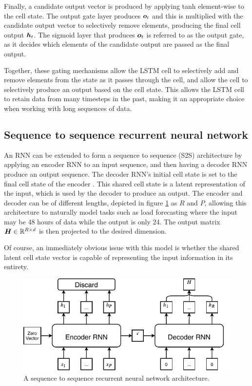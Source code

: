 Finally, a candidate output vector is produced by applying tanh element-wise to the cell state.
The output gate layer produces ${\bm{o}}_t$ and this is multiplied with the candidate output vector to selectively remove elements, producing the final cell output ${\bm{h}}_t$.
The sigmoid layer that produces ${\bm{o}}_t$ is referred to as the output gate, as it decides which elements of the candidate output are passed as the final output.

Together, these gating mechanisms allow the LSTM cell to selectively add and remove elements from the state as it passes through the cell, and allow the cell to selectively produce an output based on the cell state.
This allows the LSTM cell to retain data from many timesteps in the past, making it an appropriate choice when working with long sequences of data.

\subsection{Sequence to sequence recurrent neural network}
\label{section-S2S}
An RNN can be extended to form a sequence to sequence (S2S) architecture by applying an encoder RNN to an input sequence, and then having a decoder RNN produce an output sequence.
The decoder RNN's initial cell state is set to the final cell state of the encoder \cite{Cho2014a}.
This shared cell state is a latent representation of the input, which is used by the decoder to produce an output.
The encoder and decoder can be of different lengths, depicted in figure \ref{fig:S2S} as $R$ and $P$, allowing this architecture to naturally model tasks such as load forecasting where the input may be 48 hours of data while the output is only 24.
The output matrix ${\bm{H}} \in \mathbb{R}^{R \times d}$ is then projected to the desired dimension.

Of course, an immediately obvious issue with this model is whether the shared latent cell state vector is capable of representing the input information in its entirety.

\begin{figure}[htbp]
	\centerline{\includegraphics[trim=0 0cm 0 0, width=.75\textwidth]{images/S2S.pdf}}
	\caption{A sequence to sequence recurrent neural network architecture.}
	\label{fig:S2S}
\end{figure}

